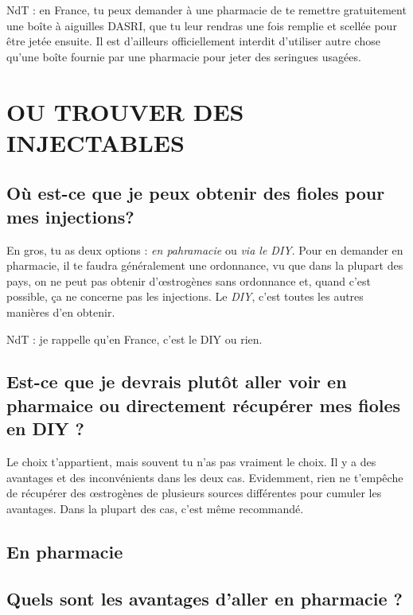 \documentclass{article}
\begin{document}
NdT : en France, tu peux demander à une pharmacie de te remettre gratuitement une boîte à aiguilles DASRI, que tu leur rendras une fois remplie et scellée pour être jetée ensuite. Il est d'ailleurs officiellement interdit d'utiliser autre chose qu'une boîte fournie par une pharmacie pour jeter des seringues usagées.

\section{OU TROUVER DES INJECTABLES}\label{sv}

\subsection{Où est-ce que je peux obtenir des fioles pour mes injections?}

En gros, tu as deux options : \textit{en pahramacie} ou \textit{via le DIY}. Pour en demander en pharmacie, il te faudra généralement une ordonnance, vu que dans la plupart des pays, on ne peut pas obtenir d'œstrogènes sans ordonnance et, quand c'est possible, ça ne concerne pas les injections. Le \textit{DIY}, c'est toutes les autres manières d'en obtenir.

NdT : je rappelle qu'en France, c'est le DIY ou rien. 

\subsection{Est-ce que je devrais plutôt aller voir en pharmaice ou directement récupérer mes fioles en DIY ?}

Le choix t'appartient, mais souvent tu n'as pas vraiment le choix. Il y a des avantages et des inconvénients dans les deux cas. Evidemment, rien ne t'empêche de récupérer des œstrogènes de plusieurs sources différentes pour cumuler les avantages. Dans la plupart des cas, c'est même recommandé.

\subsection*{En pharmacie}

\subsection{Quels sont les avantages d'aller en pharmacie ?}
\end{document}
